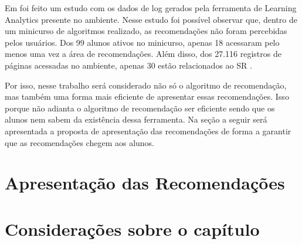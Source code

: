 Em  foi feito um estudo com os dados de log gerados pela ferramenta de Learning Analytics
presente no ambiente. Nesse estudo foi possível observar que, dentro de um minicurso de algoritmos realizado, as
recomendações não foram percebidas pelos usuários. Dos 99 alunos ativos no minicurso, apenas 18 acessaram pelo menos
uma vez a área de recomendações. Além disso, dos 27.116 registros de páginas acessadas no ambiente, apenas 30 estão
relacionados ao SR \cite{de2017sistema}.

Por isso, nesse trabalho será considerado não só o algoritmo de recomendação, mas também uma forma mais eficiente de
apresentar essas recomendações. Isso porque não adianta o algoritmo de recomendação ser eficiente sendo que os alunos
nem sabem da existência dessa ferramenta. Na seção a seguir será apresentada a proposta de apresentação das
recomendações de forma a garantir que as recomendações chegem aos alunos.

\section{Apresentação das Recomendações}

\section{Considerações sobre o capítulo}
